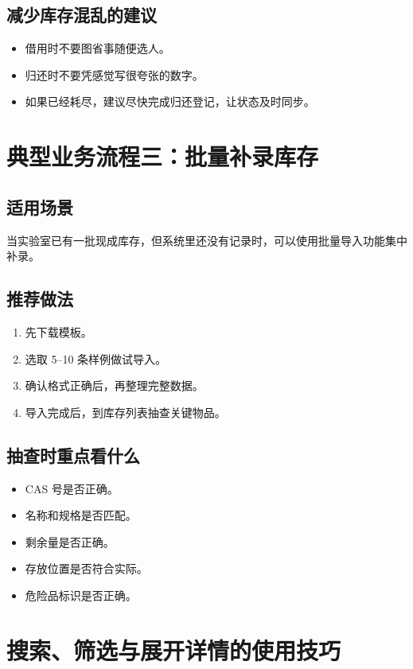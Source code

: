 \documentclass[12pt,a4paper]{ctexart}
\begin{document}
\subsection{减少库存混乱的建议}
\begin{itemize}
  \item 借用时不要图省事随便选人。
  \item 归还时不要凭感觉写很夸张的数字。
  \item 如果已经耗尽，建议尽快完成归还登记，让状态及时同步。
\end{itemize}

\newpage
\section{典型业务流程三：批量补录库存}

\subsection{适用场景}
当实验室已有一批现成库存，但系统里还没有记录时，可以使用批量导入功能集中补录。

\subsection{推荐做法}
\begin{enumerate}
  \item 先下载模板。
  \item 选取 5--10 条样例做试导入。
  \item 确认格式正确后，再整理完整数据。
  \item 导入完成后，到库存列表抽查关键物品。
\end{enumerate}

\subsection{抽查时重点看什么}
\begin{itemize}
  \item CAS 号是否正确。
  \item 名称和规格是否匹配。
  \item 剩余量是否正确。
  \item 存放位置是否符合实际。
  \item 危险品标识是否正确。
\end{itemize}

\newpage
\section{搜索、筛选与展开详情的使用技巧}
\end{document}
